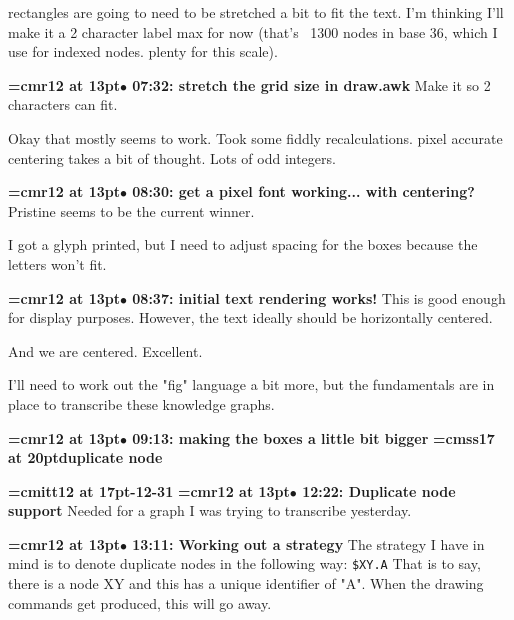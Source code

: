 rectangles are going to need to be stretched a bit to fit the text. I'm thinking I'll make it a 2 character label max for now (that's ~1300 nodes in base 36, which I use for indexed nodes. plenty for this scale).
\par

{\smallskip\noindent\bf\font\titlefont=cmr12 at 13pt\titlefont $\bullet$ 07:32: stretch the grid size in draw.awk}\smallskip
Make it so 2 characters can fit.
\par

Okay that mostly seems to work. Took some fiddly recalculations. pixel accurate centering takes a bit of thought. Lots of odd integers.
\par

{\smallskip\noindent\bf\font\titlefont=cmr12 at 13pt\titlefont $\bullet$ 08:30: get a pixel font working... with centering?}\smallskip
Pristine seems to be the current winner.
\par

I got a glyph printed, but I need to adjust spacing for the boxes because the letters won't fit.
\par

{\smallskip\noindent\bf\font\titlefont=cmr12 at 13pt\titlefont $\bullet$ 08:37: initial text rendering works!}\smallskip
This is good enough for display purposes. However, the text ideally should be horizontally centered.
\par

And we are centered. Excellent.
\par

I'll need to work out the "fig" language a bit more, but the fundamentals are in place to transcribe these knowledge graphs.
\par

{\smallskip\noindent\bf\font\titlefont=cmr12 at 13pt\titlefont $\bullet$ 09:13: making the boxes a little bit bigger}\smallskip
{}
{\medskip\noindent\bf\font\titlefont=cmss17 at 20pt\titlefont duplicate node}\medskip

{\medskip\noindent\bf\font\titlefont=cmitt12 at 17pt-12-31}\medskip
{\smallskip\noindent\bf\font\titlefont=cmr12 at 13pt\titlefont $\bullet$ 12:22: Duplicate node support}\smallskip
Needed for a graph I was trying to transcribe yesterday.
\par

{\smallskip\noindent\bf\font\titlefont=cmr12 at 13pt\titlefont $\bullet$ 13:11: Working out a strategy}\smallskip
The strategy I have in mind is to denote duplicate nodes in the following way: {\tt \$XY.A} That is to say, there is a node XY and this has a unique identifier of "A". When the drawing commands get produced, this will go away.
\par

